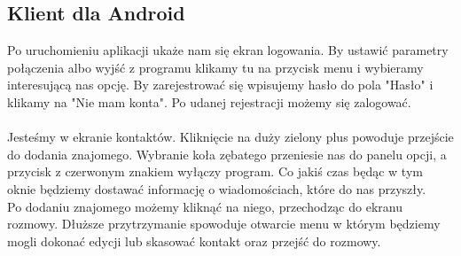 \documentclass[10pt,a4paper]{article}
\begin{document}
	\subsection{Klient dla Android}
		Po uruchomieniu aplikacji ukaże nam się ekran logowania. By ustawić parametry połączenia albo wyjść z programu
		klikamy tu na przycisk menu i wybieramy interesującą nas opcję. By zarejestrować się wpisujemy hasło do pola "Hasło" 
		i klikamy na "Nie mam konta". Po udanej rejestracji możemy się zalogować. \\ \\
		Jesteśmy w ekranie kontaktów. Kliknięcie na duży zielony plus powoduje przejście do dodania znajomego. Wybranie koła
		zębatego przeniesie nas do panelu opcji, a przycisk z czerwonym znakiem wyłączy program. Co jakiś czas będąc w tym oknie
		będziemy dostawać informację o wiadomościach, które do nas przyszły. \\
		Po dodaniu znajomego możemy kliknąć na niego, przechodząc do ekranu rozmowy. Dłuższe przytrzymanie spowoduje otwarcie
		menu w którym będziemy mogli dokonać edycji lub skasować kontakt oraz przejść do rozmowy. \\
\end{document}
